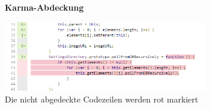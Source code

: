 \documentclass[qualitaetssicherung.tex]{subfiles}
\begin{document}
\begin{itemize}
	\begin{figure}[H]
		\centering
    \textbf{Karma-Abdeckung}\par\medskip
    \includegraphics[width=0.8\textwidth]{Images/karma-example-2.png}
    \caption{Die nicht abgedeckte Codezeilen werden rot markiert}
		\label{karma_example_2}
	\end{figure}
	

\end{itemize}
		
\end{document}
